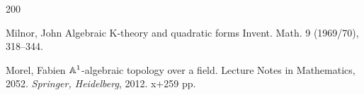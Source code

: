\documentclass[12pt]{article}
\begin{document}
\begin{thebibliography}{200}
 
 

 

 

 
 

 
 
 
 
 
 Milnor, John
Algebraic K-theory and quadratic forms
Invent. Math. 9 (1969/70), 318–344.

  Morel, Fabien ${\mathbb{A}}^1$-algebraic topology over a field. Lecture Notes in Mathematics, 2052. {\it Springer, Heidelberg}, 2012. x+259 pp.
 
%




\end{thebibliography}
\end{document}
